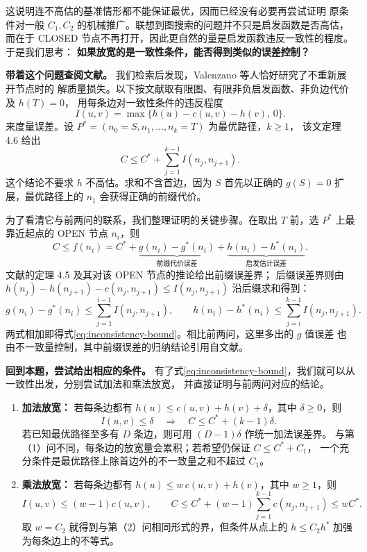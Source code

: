 \documentclass[utf8]{ctexart}
\theoremstyle{mystyle}
\begin{document}
这说明连不高估的基准情形都不能保证最优，因而已经没有必要再尝试证明
原条件对一般 $C_1,C_2$ 的机械推广。联想到图搜索的问题并不只是启发函数是否高估，而在于 CLOSED 节点不再打开，因此更自然的量是启发函数违反一致性的程度。于是我们思考：
\textbf{如果放宽的是一致性条件，能否得到类似的误差控制？}

\medskip
\noindent\textbf{带着这个问题查阅文献。}
我们检索后发现，Valenzano 等人\cite{valenzano2014}恰好研究了不重新展开节点时的
解质量损失。以下按文献取有限图、有限非负启发函数、非负边代价及 $h(T)=0$，
用每条边对一致性条件的违反程度
\[
 I(u,v)=\max\{h(u)-c(u,v)-h(v),\,0\}.
\]
来度量误差。设 $P^*=(n_0=S,n_1,\ldots,n_k=T)$ 为最优路径，$k\ge1$，
该文定理 4.6 给出
\begin{equation}
 \boxed{C\le C^*+\sum_{j=1}^{k-1}I(n_j,n_{j+1}).}
 \label{eq:inconsistency-bound}
\end{equation}
这个结论不要求 $h$ 不高估。求和不含首边，因为 $S$ 首先以正确的 $g(S)=0$
扩展，最优路径上的 $n_1$ 会获得正确的前缀代价。

为了看清它与前两问的联系，我们整理证明的关键步骤。在取出 $T$ 前，选 $P^*$ 上最靠近起点的
OPEN 节点 $n_i$，则
\[
 C\le f(n_i)
 =C^*+\underbrace{g(n_i)-g^*(n_i)}_{\text{前缀代价误差}}
       +\underbrace{h(n_i)-h^*(n_i)}_{\text{启发估计误差}}.
\]
文献的定理 4.5 及其对该 OPEN 节点的推论给出前缀误差界；
后缀误差界则由 $h(n_j)-h(n_{j+1})-c(n_j,n_{j+1})\le I(n_j,n_{j+1})$
沿后缀求和得到：
\[
 g(n_i)-g^*(n_i)\le\sum_{j=1}^{i-1}I(n_j,n_{j+1}),\qquad
 h(n_i)-h^*(n_i)\le\sum_{j=i}^{k-1}I(n_j,n_{j+1}).
\]
两式相加即得式\eqref{eq:inconsistency-bound}。相比前两问，这里多出的 $g$ 值误差
也由不一致量控制，其中前缀误差的归纳结论引用自文献。

\newpage
\noindent\textbf{回到本题，尝试给出相应的条件。}
有了式\eqref{eq:inconsistency-bound}，我们就可以从一致性出发，分别尝试加法和乘法放宽，
并直接证明与前两问对应的结论。
\begin{enumerate}[label=\arabic*.,leftmargin=2em,itemsep=8pt]
 \item \textbf{加法放宽：}
 若每条边都有 $h(u)\le c(u,v)+h(v)+\delta$，其中 $\delta\ge0$，则
 \[
   I(u,v)\le\delta
   \quad\Longrightarrow\quad C\le C^*+(k-1)\delta.
 \]
 若已知最优路径至多有 $D$ 条边，则可用 $(D-1)\delta$ 作统一加法误差界。
 与第（1）问不同，每条边的放宽量会累积；若希望仍保证 $C\le C^*+C_1$，
 一个充分条件是最优路径上除首边外的不一致量之和不超过 $C_1$。

 \item \textbf{乘法放宽：}
 若每条边都有 $h(u)\le w\,c(u,v)+h(v)$，其中 $w\ge1$，则
 \[
   I(u,v)\le(w-1)c(u,v),
   \qquad
   C\le C^*+(w-1)\sum_{j=1}^{k-1}c(n_j,n_{j+1})\le wC^*.
 \]
 取 $w=C_2$ 就得到与第（2）问相同形式的界，但条件从点上的
 $h\le C_2h^*$ 加强为每条边上的不等式。
\end{enumerate}
\end{document}
